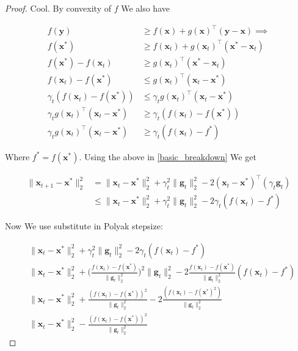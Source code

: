 \documentclass{article}
\begin{document}
\begin{proof}
	Cool. By convexity of $f$ We also have 
	
	\begin{align}
		f(\mathbf{y}) &\ge f(\mathbf{x}) + g(\mathbf{x})^\top(\mathbf{y}-\mathbf{x})\implies\\
		f(\mathbf{x}^*) &\ge f(\mathbf{x}_t) + g(\mathbf{x}_t)^\top(\mathbf{x}^*-\mathbf{x}_t)\\
		f(\mathbf{x}^*) - f(\mathbf{x}_t) &\ge  g(\mathbf{x}_t)^\top(\mathbf{x}^*-\mathbf{x}_t)\\
		f(\mathbf{x}_t) - f(\mathbf{x}^*)   &\le  g(\mathbf{x}_t)^\top(\mathbf{x}_t - \mathbf{x}^*)\\
		\gamma_t(f(\mathbf{x}_t) - f(\mathbf{x}^*))   &\le  \gamma_tg(\mathbf{x}_t)^\top(\mathbf{x}_t - \mathbf{x}^*)\\
		 \gamma_tg(\mathbf{x}_t)^\top(\mathbf{x}_t - \mathbf{x}^*) &\ge   \gamma_t(f(\mathbf{x}_t) - f(\mathbf{x}^*)) \\
		  \gamma_tg(\mathbf{x}_t)^\top(\mathbf{x}_t - \mathbf{x}^*) &\ge   \gamma_t(f(\mathbf{x}_t) - f^*) 
	\end{align}
	
	Where $f^* = f(\mathbf{x}^*)$. Using the above in \ref{basic_breakdown} We get
	
	\begin{align}
		\| \mathbf{x}_{t+1} - \mathbf{x}^*\|^2_2 &= \|\mathbf{x}_t-\mathbf{x}^*\|^2_2 + \gamma_t^2\| \mathbf{g}_t\|^2_2 - 2(\mathbf{x}_t-\mathbf{x}^*)^\top(\gamma_t \mathbf{g}_t)\\
		&\le \|\mathbf{x}_t-\mathbf{x}^*\|^2_2 + \gamma_t^2\| \mathbf{g}_t\|^2_2 - 2\gamma_t(f(\mathbf{x}_t) - f^*)
	\end{align}
	
	Now We use substitute in Polyak stepsize:
	
	\begin{align}
		&\|\mathbf{x}_t-\mathbf{x}^*\|^2_2 + \gamma_t^2\| \mathbf{g}_t\|^2_2 - 2\gamma_t(f(\mathbf{x}_t) - f^*)\\
		&\|\mathbf{x}_t-\mathbf{x}^*\|^2_2 + \bigg(\frac{ f(\mathbf{x}_t) - f(\mathbf{x}^*)}{\|\mathbf{g}_t\|^2_2}\bigg)^2\| \mathbf{g}_t\|^2_2 - 2\frac{ f(\mathbf{x}_t) - f(\mathbf{x}^*)}{\|\mathbf{g}_t\|^2_2}(f(\mathbf{x}_t) - f^*)\\
		&\|\mathbf{x}_t-\mathbf{x}^*\|^2_2 +\frac{ (f(\mathbf{x}_t) - f(\mathbf{x}^*))^2}{\|\mathbf{g}_t\|^2_2} - 2\frac{ (f(\mathbf{x}_t) - f(\mathbf{x}^*)^2)}{\|\mathbf{g}_t\|^2_2}\\
		&\|\mathbf{x}_t-\mathbf{x}^*\|^2_2 - \frac{ (f(\mathbf{x}_t) - f(\mathbf{x}^*))^2}{\|\mathbf{g}_t\|^2_2} 
	\end{align}
	

\end{proof}
\end{document}
